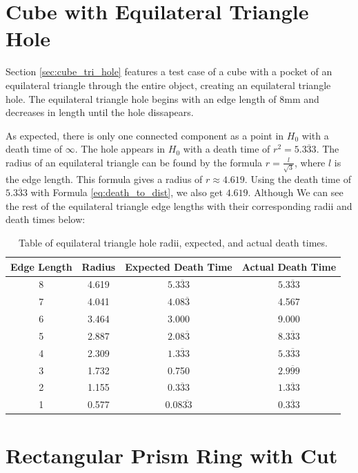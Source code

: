 \documentclass[ma]{uncgdissertationexp}
\theoremstyle{plain}
\theoremstyle{definition}
\theoremstyle{remark}
\begin{document}
\section{Cube with Equilateral Triangle Hole}
\par Section \ref{sec:cube_tri_hole} features a test case of a cube with a pocket of an equilateral triangle through the entire object, creating an equilateral triangle hole. The equilateral triangle hole begins with an edge length of 8mm and decreases in length until the hole dissapears.
\par As expected, there is only one connected component as a point in $H_{0}$ with a death time of $\infty$. The hole appears in $H_{0}$ with a death time of $r^{2} = 5.\overline{333}$. The radius of an equilateral triangle can be found by the formula $r = \frac{l}{\sqrt{3}}$, where $l$ is the edge length. This formula gives a radius of $r\approx 4.619$. Using the death time of $5.\overline{333}$ with Formula \ref{eq:death_to_dist}, we also get $4.619$. Although We can see the rest of the equilateral triangle edge lengths with their corresponding radii and death times below:
\begin{table}[H]
\centering
\begin{tabular}{|c|c|c|c|}
    \hline
    Edge Length & Radius & Expected Death Time & Actual Death Time\\
    \hline
    8     & 4.619 & $5.\overline{333}$ & $5.\overline{333}$\\
    7     & 4.041 & $4.08\overline{3}$ & 4.567 \\
    6     & 3.464 & 3.000 & 9.000\\
    5     & 2.887 & $2.08\overline{3}$ & $8.\overline{333}$\\
    4     & 2.309  & $1.\overline{333}$ & $5.\overline{333}$\\
    3     & 1.732 & 0.750 & $2.\overline{999}$\\
    2     & 1.155 & $0.\overline{333}$ & $1.\overline{333}$\\
    1     & 0.577 & $0.08\overline{33}$ & $0.\overline{333}$\\
    \hline
\end{tabular}
\caption{Table of equilateral triangle hole radii, expected, and actual death times.}
\end{table}

\section{Rectangular Prism Ring with Cut}
\end{document}
